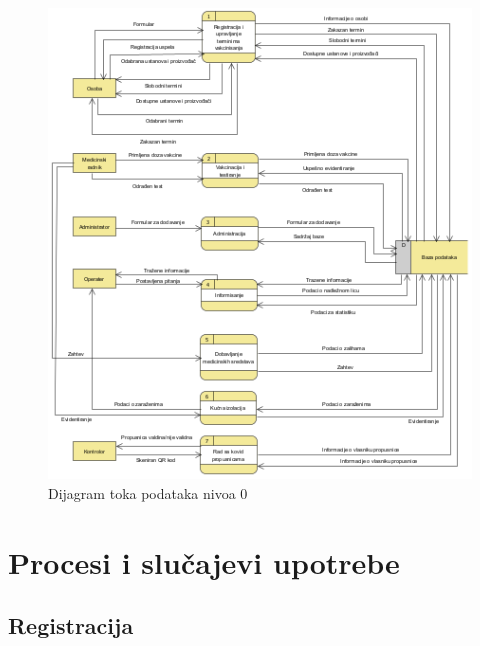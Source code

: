 \documentclass[titlepage]{article}
\begin{document}
\begin{figure}[H]
\centering
\includegraphics[scale=0.45]{DTP_dijagram}
\caption{Dijagram toka podataka nivoa 0}
\label{slk:dtp}
\end{figure}


\section{Procesi i slučajevi upotrebe}


\subsection{Registracija}
\end{document}
